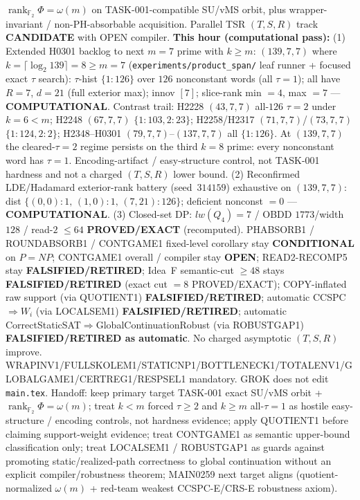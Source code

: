 \documentclass[11pt]{article}
\begin{document}
$\operatorname{rank}_{\mathbb F_2}\Phi=\omega(m)$ on TASK-001-compatible SU/vMS orbit,
plus wrapper-invariant / non-PH-absorbable acquisition.
Parallel TSR $(T,S,R)$ track \textbf{CANDIDATE} with OPEN compiler.
\textbf{This hour (computational pass):}
(1) Extended H0301 backlog to next $m{=}7$ prime with $k{\ge}m$:
$(139,7,7)$ where $k=\lceil\log_2 139\rceil=8{\ge}m{=}7$
(\texttt{experiments/product\_span/} leaf runner + focused exact $\tau$ search):
$\tau$-hist $\{1{:}126\}$ over $126$ nonconstant words (all $\tau{=}1$);
all have $R{=}7$, $d{=}21$ (full exterior max); innov $[7]$;
slice-rank min $=4$, max $=7$ --- \textbf{COMPUTATIONAL}.
Contrast trail: H2228 $(43,7,7)$ all-$126$ $\tau{=}2$ under $k{=}6{<}m$;
H2248 $(67,7,7)$ $\{1{:}103,2{:}23\}$; H2258/H2317 $(71,7,7)$/$(73,7,7)$ $\{1{:}124,2{:}2\}$;
H2348--H0301 $(79,7,7)$--$(137,7,7)$ all $\{1{:}126\}$.
At $(139,7,7)$ the cleared-$\tau{=}2$ regime persists on the third $k{=}8$ prime:
every nonconstant word has $\tau{=}1$. Encoding-artifact / easy-structure control,
not TASK-001 hardness and not a charged $(T,S,R)$ lower bound.
(2) Reconfirmed LDE/Hadamard exterior-rank battery (seed~$314159$) exhaustive on
$(139,7,7)$: dist $\{(0,0){:}1,\,(1,0){:}1,\,(7,21){:}126\}$; deficient nonconst $=0$ ---
\textbf{COMPUTATIONAL}.
(3) Closed-set DP: $lw(Q_4)=7$ / OBDD $1773$/width $128$ / read-$2$ $\le64$
\textbf{PROVED/EXACT} (recomputed).
PHABSORB1 / ROUNDABSORB1 / CONTGAME1 fixed-level corollary stay \textbf{CONDITIONAL} on $P=NP$;
CONTGAME1 overall / compiler stay \textbf{OPEN}; READ2-RECOMP5 stay \textbf{FALSIFIED/RETIRED};
Idea~F semantic-cut $\ge48$ stays \textbf{FALSIFIED/RETIRED} (exact cut $=8$ PROVED/EXACT);
COPY-inflated raw support (via QUOTIENT1) \textbf{FALSIFIED/RETIRED};
automatic CCSPC$\Rightarrow W_i$ (via LOCALSEM1) \textbf{FALSIFIED/RETIRED};
automatic CorrectStaticSAT$\Rightarrow$GlobalContinuationRobust (via ROBUSTGAP1)
\textbf{FALSIFIED/RETIRED as automatic}.
No charged asymptotic $(T,S,R)$ improve.
WRAPINV1/FULLSKOLEM1/STATICNP1/BOTTLENECK1/TOTALENV1/GLOBALGAME1/CERTREG1/RESPSEL1 mandatory.
GROK does not edit \texttt{main.tex}.
Handoff: keep primary target TASK-001 exact SU/vMS orbit + $\operatorname{rank}_{\mathbb F_2}\Phi=\omega(m)$;
treat $k{<}m$ forced $\tau{\ge}2$ and $k{\ge}m$ all-$\tau{=}1$ as hostile easy-structure /
encoding controls, not hardness evidence; apply QUOTIENT1 before claiming support-weight
evidence; treat CONTGAME1 as semantic upper-bound classification only; treat LOCALSEM1 /
ROBUSTGAP1 as guards against promoting static/realized-path correctness to global
continuation without an explicit compiler/robustness theorem; MAIN0259 next target
aligns (quotient-normalized $\omega(m)$ + red-team weakest CCSPC-E/CRS-E robustness axiom).
\end{document}
